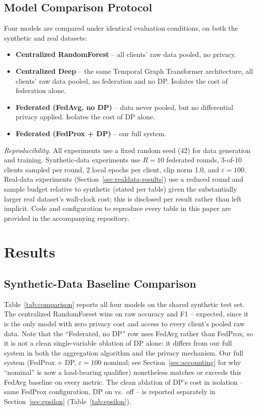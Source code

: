\documentclass[12pt]{svproc}
\begin{document}
\subsection{Model Comparison Protocol}
Four models are compared under identical evaluation conditions, on both
the synthetic and real datasets:
\begin{itemize}
\item \textbf{Centralized RandomForest} -- all clients' raw data pooled,
no privacy.
\item \textbf{Centralized Deep} -- the same Temporal Graph Transformer
architecture, all clients' raw data pooled, no federation and no DP.
Isolates the cost of federation alone.
\item \textbf{Federated (FedAvg, no DP)} -- data never pooled, but no
differential privacy applied. Isolates the cost of DP alone.
\item \textbf{Federated (FedProx + DP)} -- our full system.
\end{itemize}

\textit{Reproducibility.} All experiments use a fixed random seed (42)
for data generation and training. Synthetic-data experiments use
$R=10$ federated rounds, 3-of-10 clients sampled per round, 2 local
epochs per client, clip norm 1.0, and $\varepsilon=100$. Real-data
experiments (Section~\ref{sec:realdata-results}) use a reduced round
and sample budget relative to synthetic (stated per table) given the
substantially larger real dataset's wall-clock cost; this is disclosed
per result rather than left implicit. Code and configuration to
reproduce every table in this paper are provided in the accompanying
repository.

\section{Results}
\label{sec:results}

\subsection{Synthetic-Data Baseline Comparison}
Table~\ref{tab:comparison} reports all four models on the shared
synthetic test set. The centralized RandomForest wins on raw accuracy
and F1 -- expected, since it is the only model with zero privacy cost
and access to every client's pooled raw data. Note that the
``Federated, no DP'' row uses FedAvg rather than FedProx, so it is not
a clean single-variable ablation of DP alone: it differs from our full
system in both the aggregation algorithm and the privacy mechanism. Our
full system (FedProx + DP, $\varepsilon=100$ nominal; see
Section~\ref{sec:accounting} for why ``nominal'' is now a load-bearing
qualifier) nonetheless matches or exceeds this FedAvg baseline on every
metric. The clean ablation of DP's cost in isolation -- same FedProx
configuration, DP on vs.\ off -- is reported separately in
Section~\ref{sec:epsilon} (Table~\ref{tab:epsilon}).
\end{document}
